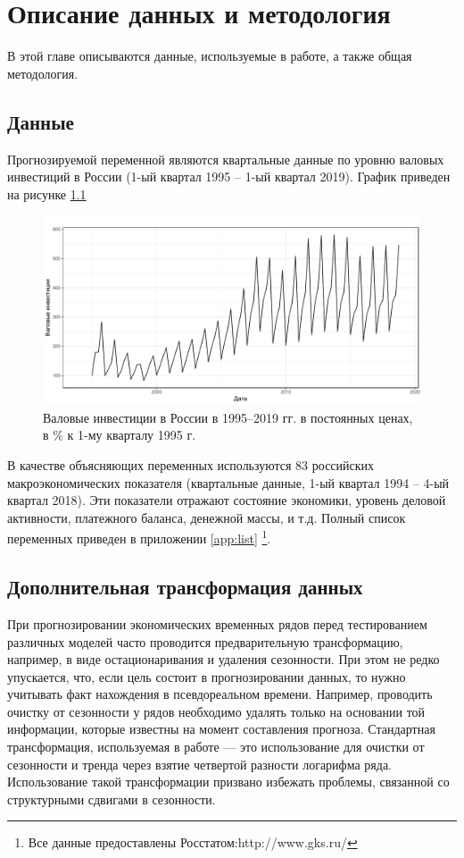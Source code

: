 \chapter{Описание данных и методология} \label{ch:data}
В этой главе описываются данные, используемые в работе, а также общая методология.
\section{Данные}
Прогнозируемой переменной являются квартальные данные по уровню валовых инвестиций в России (1-ый квартал 1995 -- 1-ый квартал 2019). График приведен на рисунке \ref{fig:level}

\begin{figure}[h]
    \centering
    \includegraphics[width = \textwidth]{level_plot.pdf}
    \caption{Валовые инвестиции в России в 1995--2019 гг. в постоянных ценах, в \% к 1-му кварталу 1995 г.}
    \label{fig:level}
\end{figure}

В качестве объясняющих переменных используются 83 российских макроэкономических показателя (квартальные данные,  1-ый квартал 1994 -- 4-ый квартал 2018). Эти показатели отражают состояние экономики, уровень деловой активности, платежного баланса, денежной массы, и т.д. Полный список переменных приведен в приложении \ref{app:list} \footnote{Все данные предоставлены Росстатом:http://www.gks.ru/}.

\section{Дополнительная трансформация данных}
При прогнозировании экономических временных рядов перед тестированием различных моделей часто проводится предварительную трансформацию, например, в виде остационаривания и удаления сезонности. При этом не редко упускается, что, если цель состоит в прогнозировании данных, то нужно учитывать факт нахождения в псевдореальном времени. Например, проводить очистку от сезонности у рядов необходимо удалять только на основании той информации, которые известны на момент составления прогноза. Стандартная трансформация, используемая в работе --- это использование для очистки от сезонности и тренда через взятие четвертой разности логарифма ряда. Использование такой трансформации призвано избежать проблемы, связанной со структурными сдвигами в сезонности.

